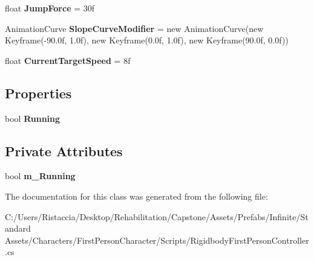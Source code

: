 \begin{DoxyCompactItemize}
float {\bfseries Jump\+Force} = 30f
\item 
\mbox{\label{class_unity_standard_assets_1_1_characters_1_1_first_person_1_1_rigidbody_first_person_controller_1_1_movement_settings_a5197708ff80999c54a315c2e6b123b95}} 
Animation\+Curve {\bfseries Slope\+Curve\+Modifier} = new Animation\+Curve(new Keyframe(-\/90.\+0f, 1.\+0f), new Keyframe(0.\+0f, 1.\+0f), new Keyframe(90.\+0f, 0.\+0f))
\item 
\mbox{\label{class_unity_standard_assets_1_1_characters_1_1_first_person_1_1_rigidbody_first_person_controller_1_1_movement_settings_ac34c4f343b27db3472bad2d03fe98b2b}} 
float {\bfseries Current\+Target\+Speed} = 8f
\end{DoxyCompactItemize}
\subsection*{Properties}
\begin{DoxyCompactItemize}
\item 
\mbox{\label{class_unity_standard_assets_1_1_characters_1_1_first_person_1_1_rigidbody_first_person_controller_1_1_movement_settings_a6bc82cc4733822ca23b6ecdd528a5e07}} 
bool {\bfseries Running}
\end{DoxyCompactItemize}
\subsection*{Private Attributes}
\begin{DoxyCompactItemize}
\item 
\mbox{\label{class_unity_standard_assets_1_1_characters_1_1_first_person_1_1_rigidbody_first_person_controller_1_1_movement_settings_a7ca236d4d9ad8aa8d8ba7353bf8a44bd}} 
bool {\bfseries m\+\_\+\+Running}
\end{DoxyCompactItemize}


The documentation for this class was generated from the following file\+:\begin{DoxyCompactItemize}
\item 
C\+:/\+Users/\+Ristaccia/\+Desktop/\+Rehabilitation/\+Capstone/\+Assets/\+Prefabs/\+Infinite/\+Standard Assets/\+Characters/\+First\+Person\+Character/\+Scripts/Rigidbody\+First\+Person\+Controller.\+cs\end{DoxyCompactItemize}
